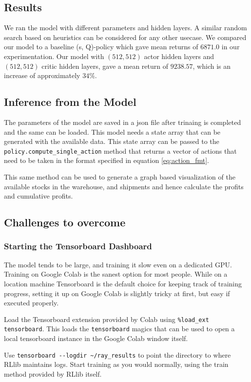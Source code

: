 \documentclass{article}
\begin{document}
\subsection{Results}
We ran the model with different parameters and hidden layers. A similar random search based on heuristics can be considered for any other usecase. We compared our model to a baseline (s, Q)-policy which gave mean returns of $6871.0$ in our experimentation. Our model with $(512, 512)$ actor hidden layers and $(512, 512)$ critic hidden layers, gave a mean return of $9238.57$, which is an increase of approximately $34 \%$.


\subsection{Inference from the Model}
The parameters of the model are saved in a json file after trinaing is completed and the same can be loaded. This model needs a state array that can be generated with the available data. This state array can be passed to the \lstinline{policy.compute_single_action} method that returns a vector of actions that need to be taken in the format specified in equation \eqref{eq:action_fmt}. 

This same method can be used to generate a graph based visualization of the available stocks in the warehouse, and shipments and hence calculate the profits and cumulative profits. 

\subsection{Challenges to overcome}
\subsubsection{Starting the Tensorboard Dashboard}
The model tends to be large, and training it slow even on a dedicated GPU. Training on Google Colab is the sanest option for most people. While on a location machine Tensorboard is the default choice for keeping track of training progress, setting it up on Google Colab is slightly tricky at first, but easy if executed properly.


Load the Tensorboard extension provided by Colab using \lstinline{%load_ext tensorboard}. This loads the \lstinline{tensorboard} magics that can be used to open a local tensorboard instance in the Google Colab window itself.

Use \lstinline{tensorboard --logdir ~/ray_results} to point the directory to where RLlib maintains logs. Start training as you would normally, using the train method provided by RLlib itself. 
\end{document}
